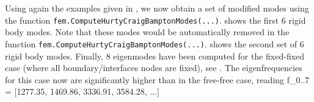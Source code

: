 Using again the examples given in , we now obtain a set of modified modes using the function \texttt{fem.ComputeHurtyCraigBamptonModes(...)}.
 shows the first 6 rigid body modes. Note that these modes would be automatically removed in the function \texttt{fem.ComputeHurtyCraigBamptonModes(...)}.
 shows the second set of 6 rigid body modes. 
Finally, 8 eigenmodes have been computed for the fixed-fixed case (where all boundary/interfaces nodes are fixed),
see . 
The eigenfrequencies for this case now are significantly higher than in the free-free case, reading
\be
  f_{0..7} = [1277.35, 1469.86, 3336.91, 3584.28, ...]
\ee

